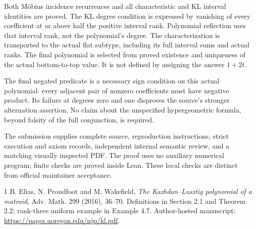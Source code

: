 \documentclass[10pt]{article}
\begin{document}
Both M\"obius incidence recurrences and all characteristic and KL interval identities are proved. The KL degree condition is expressed by vanishing of every coefficient at or above half the positive interval rank. Polynomial reflection uses that interval rank, not the polynomial's degree. The characterization is transported to the actual flat subtype, including its full interval sums and actual ranks. The final polynomial is selected from proved existence and uniqueness of the actual bottom-to-top value. It is not defined by assigning the answer $1+2t$.

The final negated predicate is a necessary sign condition on this actual polynomial: every adjacent pair of nonzero coefficients must have negative product. Its failure at degrees zero and one disproves the source's stronger alternation assertion. No claim about the unspecified hypergeometric formula, beyond falsity of the full conjunction, is required.

The submission supplies complete source, reproduction instructions, strict execution and axiom records, independent internal semantic review, and a matching visually inspected PDF. The proof uses no auxiliary numerical program; finite checks are proved inside Lean. These local checks are distinct from official maintainer acceptance.

\begin{thebibliography}{1}
 B. Elias, N. Proudfoot and M. Wakefield, \emph{The Kazhdan--Lusztig polynomial of a matroid}, Adv. Math. 299 (2016), 36--70. Definitions in Section 2.1 and Theorem 2.2; rank-three uniform example in Example 4.7. Author-hosted manuscript: \url{https://pages.uoregon.edu/njp/kl.pdf}.
\end{thebibliography}
\end{document}
